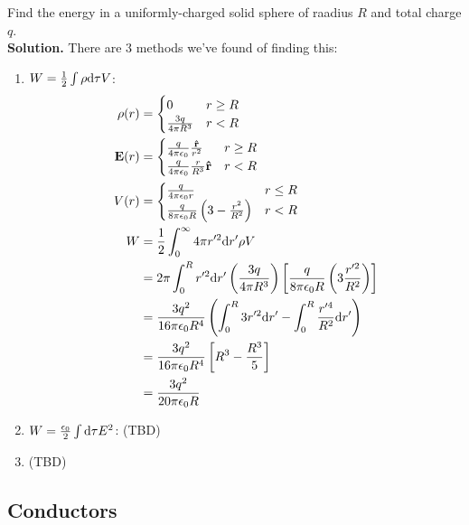 \documentclass[a4paper]{article}
\begin{document}
\begin{eg}
	Find the energy in a uniformly-charged solid sphere of raadius $R$ and
	total charge $q$.\\
	\textbf{Solution.}
	There are 3 methods we've found of finding this:
\begin{enumerate}
\item $W = \frac{1}{2}\int\rho\mathrm{d}\tau V$:
	\begin{align*}
		\rho(r) &= 
		\begin{cases}
			0 & r \geq R\\
			\frac{3q}{4\pi R^3} & r < R
		\end{cases}\\
		\boldsymbol{\mathbf{E}}(r) &=
		\begin{cases}
			\frac{q}{4\pi\epsilon_0}\frac{\boldsymbol{\mathbf{\hat{r}}}}{r^2}
				& r \geq R\\
			\frac{q}{4\pi\epsilon_0}\frac{r}{R^3}\boldsymbol{\mathbf{\hat{r}}}
				& r < R
		\end{cases}\\
		V(r) &= 
		\begin{cases}
			\frac{q}{4\pi\epsilon_0 r} & r \leq R\\
			\frac{q}{8\pi\epsilon_0 R}\left(3 - \frac{r^2}{R^2}
			\right) & r < R
		\end{cases}\\
	W &= \frac{1}{2}\int_0^\infty 4\pi r'^2\mathrm{d} r'\rho V\\
	  &= 2\pi\int_0^Rr'^2\mathrm{d} r'\left(\frac{3q}{4\pi R^3}\right)\left[
	\frac{q}{8\pi\epsilon_0 R}\left(3\frac{r'^2}{R^2}\right)\right]\\
	&= \frac{3q^2}{16\pi\epsilon_0R^4}\left(\int_0^R3r'^2\mathrm{d} r' -
	\int_0^R \frac{r'^4}{R^2}\mathrm{d} r'\right)\\
	&= \frac{3q^2}{16\pi\epsilon_0R^4}\left[R^3-\frac{R^3}{5}\right]\\
	&= \frac{3q^2}{20\pi\epsilon_0 R}
	\end{align*}
\item $W = \frac{\epsilon_0}{2}\int \mathrm{d}\tau E^2$: (TBD)
\item (TBD)
\end{enumerate}
\end{eg}

\subsection{Conductors}
\end{document}
